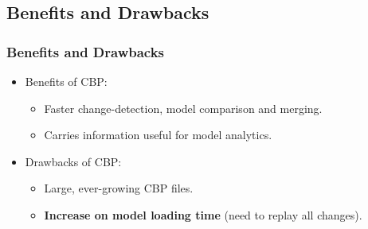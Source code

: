 \documentclass{beamer}
\begin{document}
\begin{frame}
\section{Benefits and Drawbacks}
\frametitle{Benefits and Drawbacks}
\begin{itemize}
    \item Benefits of CBP:
    \begin{itemize}
        \item Faster change-detection, model comparison and merging.
        \item Carries information useful for model analytics.
    \end{itemize} 
    \item Drawbacks of CBP:
    \begin{itemize}
        \item Large, ever-growing CBP files.
        \item \textbf{Increase on model loading time} (need to replay all changes).
    \end{itemize} 
\end{itemize}
\end{frame}
\end{document}
